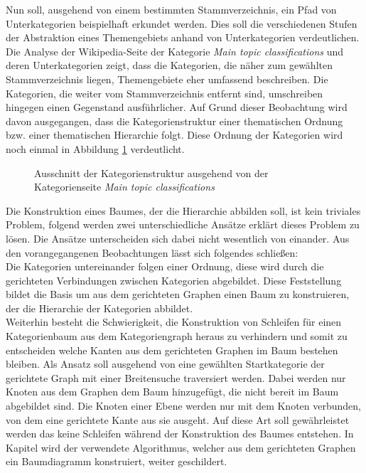 Nun soll, ausgehend von einem bestimmten Stammverzeichnis, ein Pfad von Unterkategorien beispielhaft erkundet werden.
Dies soll die verschiedenen Stufen der Abstraktion eines Themengebiets anhand von Unterkategorien verdeutlichen.
Die Analyse der Wikipedia-Seite der Kategorie \emph{Main topic classifications} und deren Unterkategorien zeigt, dass die Kategorien, die näher zum gewählten Stammverzeichnis liegen, Themengebiete eher umfassend beschreiben.
Die Kategorien, die weiter vom Stammverzeichnis entfernt sind, umschreiben hingegen einen Gegenstand ausführlicher.
Auf Grund dieser Beobachtung wird davon ausgegangen, dass die Kategorienstruktur einer thematischen Ordnung bzw. einer thematischen Hierarchie folgt. 
Diese Ordnung der Kategorien wird noch einmal in Abbildung \ref{fig:main-topic-tree} verdeutlicht.

\begin{figure}
    \centering
    \begin{tikzpicture}
    \end{tikzpicture}
    \caption{Ausschnitt der Kategorienstruktur ausgehend von der Kategorienseite \emph{Main topic classifications}}
    \label{fig:main-topic-tree}
\end{figure}

Die Konstruktion eines Baumes, der die Hierarchie abbilden soll, ist kein triviales Problem, folgend werden zwei unterschiedliche Ansätze erklärt dieses Problem zu lösen.
Die Ansätze unterscheiden sich dabei nicht wesentlich von einander.
Aus den vorangegangenen Beobachtungen lässt sich folgendes schließen:\\
Die Kategorien untereinander folgen einer Ordnung, diese wird durch die gerichteten Verbindungen zwischen Kategorien abgebildet.
Diese Feststellung bildet die Basis um aus dem gerichteten Graphen einen Baum zu konstruieren, der die Hierarchie der Kategorien abbildet.\\
Weiterhin besteht die Schwierigkeit, die Konstruktion von Schleifen für einen Kategorienbaum aus dem Kategoriengraph heraus zu verhindern und somit zu entscheiden welche Kanten aus dem gerichteten Graphen im Baum bestehen bleiben.
Als Ansatz soll ausgehend von eine gewählten Startkategorie der gerichtete Graph mit einer Breitensuche traversiert werden.
Dabei werden nur Knoten aus dem Graphen dem Baum hinzugefügt, die nicht bereit im Baum abgebildet sind.
Die Knoten einer Ebene werden nur mit dem Knoten verbunden, von dem eine gerichtete Kante aus sie ausgeht.
Auf diese Art soll gewährleistet werden das keine Schleifen während der Konstruktion des Baumes entstehen.
In Kapitel  wird der verwendete Algorithmus, welcher aus dem gerichteten Graphen ein Baumdiagramm konstruiert, weiter geschildert.\\

